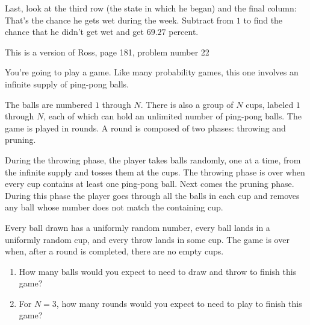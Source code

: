 \documentclass[12pt]{article}
\begin{document}
\begin{solution}
    Last, look at the third row (the state in which he began) and the
    final column:  That’s the chance he gets wet during the week.
    Subtract from \( 1 \) to find the chance that he didn’t get wet
    and get \( 69.27 \) percent.

    \begin{remark}
        This is a version of Ross, page 181, problem number 22
    \end{remark}
\end{solution}
\begin{exercise}
    You’re going to play a game.  Like many probability games, this
    one involves an infinite supply of ping-pong balls.

    The balls are numbered \( 1 \) through \( N \).  There is also a
    group of \( N \) cups, labeled \( 1 \) through \( N \), each of
    which can hold an unlimited number of ping-pong balls.  The game is
    played in rounds. A round is composed of two phases:  throwing and
    pruning.

    During the throwing phase, the player takes balls randomly, one at a
    time, from the infinite supply and tosses them at the cups.  The
    throwing phase is over when every cup contains at least one
    ping-pong ball.  Next comes the pruning phase.  During this phase
    the player goes through all the balls in each cup and removes any
    ball whose number does not match the containing cup.

    Every ball drawn has a uniformly random number, every ball lands in
    a uniformly random cup, and every throw lands in some cup.  The game
    is over when, after a round is completed, there are no empty cups.

    \begin{enumerate}[label=(\alph*)]
    \item
        How many balls would you expect to need to draw and throw to
        finish this game?
    \item
        For \( N = 3 \), how many rounds would you expect to need to
        play to finish this game?
\end{enumerate}
\end{exercise}
\end{document}
